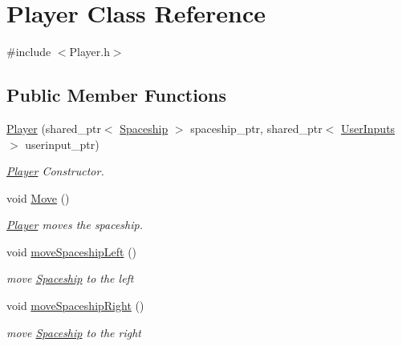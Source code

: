 \hypertarget{class_player}{}\section{Player Class Reference}
\label{class_player}


{\ttfamily \#include $<$Player.\+h$>$}

\subsection*{Public Member Functions}
\begin{DoxyCompactItemize}
\item 
\mbox{\hyperlink{class_player_a009b5a37492c5b8e07e09a29a00ea776}{Player}} (shared\+\_\+ptr$<$ \mbox{\hyperlink{class_spaceship}{Spaceship}} $>$ spaceship\+\_\+ptr, shared\+\_\+ptr$<$ \mbox{\hyperlink{class_user_inputs}{User\+Inputs}} $>$ userinput\+\_\+ptr)
\begin{DoxyCompactList}\small\item\em \mbox{\hyperlink{class_player}{Player}} Constructor. \end{DoxyCompactList}\item 
\mbox{\label{class_player_a8746f750b36da18dff7a34da2e04b2eb}} 
void \mbox{\hyperlink{class_player_a8746f750b36da18dff7a34da2e04b2eb}{Move}} ()
\begin{DoxyCompactList}\small\item\em \mbox{\hyperlink{class_player}{Player}} moves the spaceship. \end{DoxyCompactList}\item 
\mbox{\label{class_player_afff4786831835edaffd6838a8f899e6b}} 
void \mbox{\hyperlink{class_player_afff4786831835edaffd6838a8f899e6b}{move\+Spaceship\+Left}} ()
\begin{DoxyCompactList}\small\item\em move \mbox{\hyperlink{class_spaceship}{Spaceship}} to the left \end{DoxyCompactList}\item 
\mbox{\label{class_player_a4b4410400e91bfdcea764d98e8c0b760}} 
void \mbox{\hyperlink{class_player_a4b4410400e91bfdcea764d98e8c0b760}{move\+Spaceship\+Right}} ()
\begin{DoxyCompactList}\small\item\em move \mbox{\hyperlink{class_spaceship}{Spaceship}} to the right \end{DoxyCompactList}\item 

\end{DoxyCompactItemize}
